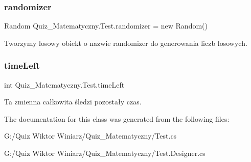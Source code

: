 \subsubsection{\texorpdfstring{randomizer}{randomizer}}
{\footnotesize\ttfamily Random Quiz\+\_\+\+Matematyczny.\+Test.\+randomizer = new Random()\hspace{0.3cm}{\ttfamily [private]}}

Tworzymy losowy obiekt o nazwie randomizer do generowania liczb losowych. \mbox{\label{class_quiz___matematyczny_1_1_test_aea063166ff36647a5ccee5c92c3cb067}} 
\subsubsection{\texorpdfstring{timeLeft}{timeLeft}}
{\footnotesize\ttfamily int Quiz\+\_\+\+Matematyczny.\+Test.\+time\+Left\hspace{0.3cm}{\ttfamily [private]}}

Ta zmienna całkowita śledzi pozostały czas. 

The documentation for this class was generated from the following files\+:\begin{DoxyCompactItemize}
\item 
G\+:/\+Quiz Wiktor Winiarz/\+Quiz\+\_\+\+Matematyczny/Test.\+cs\item 
G\+:/\+Quiz Wiktor Winiarz/\+Quiz\+\_\+\+Matematyczny/Test.\+Designer.\+cs\end{DoxyCompactItemize}
